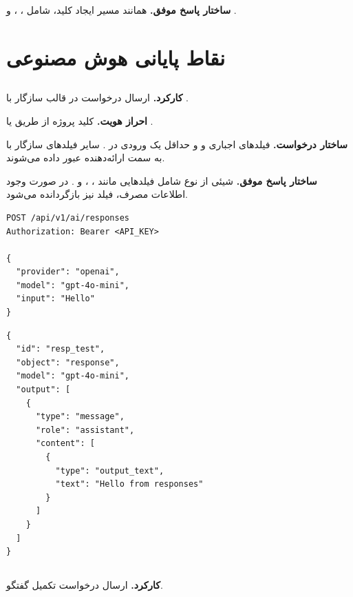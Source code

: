 \textbf{ساختار پاسخ موفق.} همانند مسیر ایجاد کلید، شامل ،
،  و .

\section{نقاط پایانی هوش مصنوعی}

\subsection{}
\textbf{کارکرد.} ارسال درخواست در قالب  سازگار با
.

\textbf{احراز هویت.} کلید پروژه از طریق  یا
.

\textbf{ساختار درخواست.} فیلدهای اجباری  و  و
حداقل یک ورودی در . سایر فیلدهای سازگار با 
به سمت ارائه‌دهنده عبور داده می‌شوند.

\textbf{ساختار پاسخ موفق.} شیئی از نوع  شامل فیلدهایی مانند
، ،  و . در صورت وجود اطلاعات
مصرف، فیلد  نیز بازگردانده می‌شود.

\begin{latin}
\begin{lstlisting}[style=jsonStyle]
POST /api/v1/ai/responses
Authorization: Bearer <API_KEY>

{
  "provider": "openai",
  "model": "gpt-4o-mini",
  "input": "Hello"
}
\end{lstlisting}
\end{latin}


\begin{latin}
\begin{lstlisting}[style=jsonStyle]
{
  "id": "resp_test",
  "object": "response",
  "model": "gpt-4o-mini",
  "output": [
    {
      "type": "message",
      "role": "assistant",
      "content": [
        {
          "type": "output_text",
          "text": "Hello from responses"
        }
      ]
    }
  ]
}
\end{lstlisting}
\end{latin}


\subsection{}
\textbf{کارکرد.} ارسال درخواست تکمیل گفتگو.


